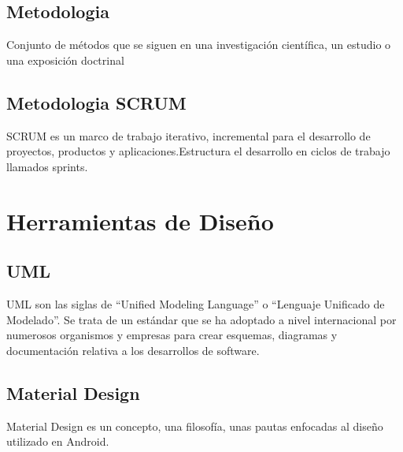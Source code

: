 \subsection{Metodologia}
Conjunto de métodos que se siguen en una investigación científica, un estudio o una exposición doctrinal
\subsection{Metodologia SCRUM}
SCRUM es un marco de trabajo iterativo, incremental para el desarrollo de proyectos, productos y aplicaciones.Estructura el desarrollo en ciclos de trabajo llamados sprints.
\section{Herramientas de Diseño}

\subsection{UML}
UML son las siglas de “Unified Modeling Language” o “Lenguaje Unificado de Modelado”. Se trata de un estándar que se ha adoptado a nivel internacional por numerosos organismos y empresas para crear esquemas, diagramas y documentación relativa a los desarrollos de software.

\subsection{Material Design}
Material Design es un concepto, una filosofía, unas pautas enfocadas al diseño utilizado en Android.
